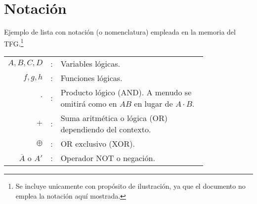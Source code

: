 %
%
\cleardoublepage
{} %

\chapter*{Notación} %

Ejemplo de lista con notación (o nomenclatura) empleada en la memoria del TFG.\footnote{Se incluye unicamente con propósito de ilustración, ya que el documento no emplea la notación aquí mostrada.}

\begin{tabular}{r r p{0.8\linewidth}}
$A, B, C, D$	& : & Variables lógicas. \\
$f, g, h$		& :	& Funciones lógicas. \\
$\cdot$			& : & Producto lógico (AND). A menudo se omitirá como en $A 
B$ en lugar de $A \cdot B$.\\
$+$				& : & Suma aritmética o lógica (OR) dependiendo del 
contexto.\\
$\oplus$		& : & OR exclusivo (XOR).\\
$\overline{A}$ o ${A}'$	& : & Operador NOT o negación.
\end{tabular}